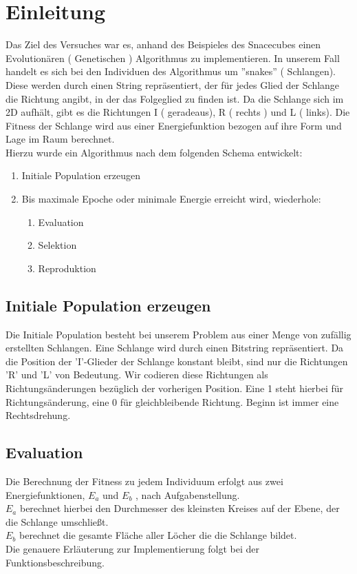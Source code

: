 \documentclass[a4paper,10pt,fleqn]{scrartcl}
\begin{document}
\section{Einleitung}
Das Ziel des Versuches war es, anhand des Beispieles des Snacecubes einen Evolutionären ( Genetischen ) Algorithmus zu implementieren. In unserem Fall handelt es sich bei den Individuen des Algorithmus um ''snakes'' ( Schlangen). Diese werden durch einen String repräsentiert, der für jedes Glied der Schlange die Richtung angibt, in der das Folgeglied zu finden ist. Da die Schlange sich im 2D aufhält, gibt es die Richtungen I ( geradeaus), R ( rechts ) und L ( links). Die Fitness der Schlange wird aus einer Energiefunktion bezogen auf ihre Form und Lage im Raum berechnet.\\
Hierzu wurde ein Algorithmus nach dem folgenden Schema entwickelt:
\begin{enumerate}
 \item   Initiale Population erzeugen 
\item Bis maximale Epoche oder minimale Energie erreicht wird, wiederhole:
\begin{enumerate}
    \item    Evaluation
     \item   Selektion
     \item   Reproduktion
\end{enumerate}
\end{enumerate}
\subsection{Initiale Population erzeugen}
Die Initiale Population besteht bei unserem Problem aus einer Menge von zufällig erstellten Schlangen. Eine Schlange wird durch einen Bitstring repräsentiert. Da die Position der 'I'-Glieder der Schlange konstant bleibt, sind nur die Richtungen 'R' und 'L' von Bedeutung. Wir codieren diese Richtungen als Richtungsänderungen bezüglich der vorherigen Position. Eine 1 steht hierbei für Richtungsänderung, eine 0 für gleichbleibende Richtung. Beginn ist immer eine Rechtsdrehung.
\subsection{Evaluation}
Die Berechnung der Fitness zu jedem Individuum erfolgt aus zwei Energiefunktionen, $E_a$ und $E_b$ , nach Aufgabenstellung. \\
$E_a$ berechnet hierbei den Durchmesser des kleinsten Kreises auf der Ebene, der die Schlange umschließt.\\
$E_b$ berechnet die gesamte Fläche aller Löcher die die Schlange bildet.\\
Die genauere Erläuterung zur Implementierung folgt bei der Funktionsbeschreibung.
\end{document}
